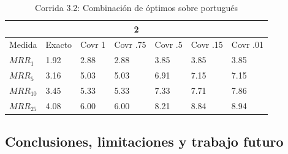\begin{table}[H]
\centering
\begin{center}
\begin{tabular}{|l | l | l | l | l | l | l |}
\hline
\multicolumn{7}{|c|}{2}  \\ \hline
Medida & Exacto & Covr 1 & Covr .75 & Covr .5 & Covr .15 & Covr .01 \\ \hline
$MRR_{1}$ & 1.92 & 2.88 & 2.88 & 3.85 & 3.85 & 3.85  \\ \hline
$MRR_{5}$ & 3.16 & 5.03 & 5.03 & 6.91 & 7.15 & 7.15  \\ \hline
$MRR_{10}$ & 3.45 & 5.33 & 5.33 & 7.33 & 7.71 & 7.86  \\ \hline
$MRR_{25}$ & 4.08 & 6.00 & 6.00 & 8.21 & 8.84 & 8.94  \\ \hline
\end{tabular}
\label{table:2_3_2_40_getExactMRRWikiFactoid_getCovrMRRWikiFactoid}
\caption{Corrida 3.2: Combinación de óptimos sobre portugués}
\end{center}
\end{table}

\subsection{Conclusiones, limitaciones y trabajo futuro}
\label{sec:clef-cierre}





